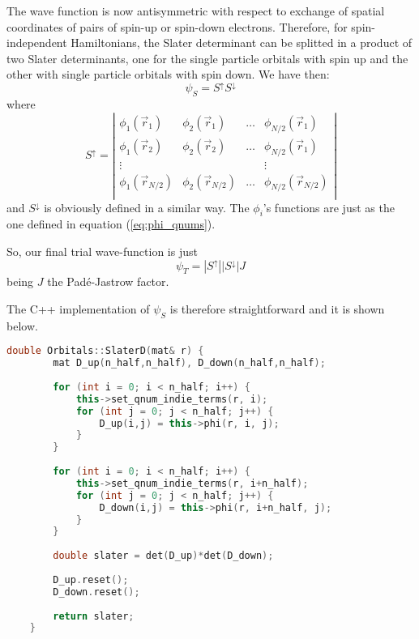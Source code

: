 The wave function is now antisymmetric with respect to exchange of spatial coordinates of pairs of spin-up or spin-down electrons. Therefore, for spin-independent Hamiltonians, the Slater determinant can be splitted in a product of two Slater determinants, one for the single particle orbitals with spin up and the other with single particle orbitals with spin down. We have then:
\begin{equation}
	\psi_S = S^{\uparrow}S^{\downarrow}
\end{equation}
where
\begin{equation}
	S^{\uparrow} = \left|
	\begin{matrix}
		\phi_1(\vec{r}_1) & \phi_2(\vec{r}_1) & \dots & \phi_{N/2}(\vec{r}_1) \\
		\phi_1(\vec{r}_2) & \phi_2(\vec{r}_2) & \dots & \phi_{N/2}(\vec{r}_1) \\
		\vdots &  &  & \vdots \\
		\phi_1(\vec{r}_{N/2}) & \phi_2(\vec{r}_{N/2}) & \dots & \phi_{N/2}(\vec{r}_{N/2}) \\
	\end{matrix}
	\right|
\end{equation}
and  $S^{\downarrow}$ is obviously defined in a similar way. The $\phi_i$'s functions are just as the one defined in equation (\ref{eq:phi_qnums}).

So, our final trial wave-function is just
\begin{equation}
	\psi_T = |S^{\uparrow}||S^{\downarrow}|J
\end{equation}
being $J$ the Padé-Jastrow factor.

The C++ implementation of $\psi_S$ is therefore straightforward and it is shown below.

\begin{lstlisting}[language=cpp]
	double Orbitals::SlaterD(mat& r) {
	    mat D_up(n_half,n_half), D_down(n_half,n_half);
	
	    for (int i = 0; i < n_half; i++) {
	        this->set_qnum_indie_terms(r, i);
	        for (int j = 0; j < n_half; j++) {
	            D_up(i,j) = this->phi(r, i, j);
	        }
	    }
	
	    for (int i = 0; i < n_half; i++) {
	        this->set_qnum_indie_terms(r, i+n_half);
	        for (int j = 0; j < n_half; j++) {
	            D_down(i,j) = this->phi(r, i+n_half, j);
	        }
	    }
	
	    double slater = det(D_up)*det(D_down);
	
	    D_up.reset();
	    D_down.reset();
	
	    return slater;
	}
\end{lstlisting}


